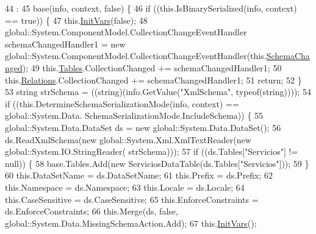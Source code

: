 \begin{DoxyCode}
44                                                                                                            
                                                 : 
45                 base(info, context, \textcolor{keyword}{false}) \{
46             \textcolor{keywordflow}{if} ((this.IsBinarySerialized(info, context) == \textcolor{keyword}{true})) \{
47                 this.\hyperlink{class_proyecto___integrador__3_1_1ds_servicios_a58f88c51e90b3494390aa1cd37635db0}{InitVars}(\textcolor{keyword}{false});
48                 global::System.ComponentModel.CollectionChangeEventHandler schemaChangedHandler1 = \textcolor{keyword}{new} 
      global::System.ComponentModel.CollectionChangeEventHandler(this.\hyperlink{class_proyecto___integrador__3_1_1ds_servicios_ac0aff57addf6d1f24077d11c3abe845e}{SchemaChanged});
49                 this.\hyperlink{class_proyecto___integrador__3_1_1ds_servicios_a2b08d569f4f435957a1f10b46c304cb2}{Tables}.CollectionChanged += schemaChangedHandler1;
50                 this.\hyperlink{class_proyecto___integrador__3_1_1ds_servicios_a4a938f593d4405efc7c790a3b3a5b9d7}{Relations}.CollectionChanged += schemaChangedHandler1;
51                 \textcolor{keywordflow}{return};
52             \}
53             \textcolor{keywordtype}{string} strSchema = ((string)(info.GetValue(\textcolor{stringliteral}{"XmlSchema"}, typeof(\textcolor{keywordtype}{string}))));
54             \textcolor{keywordflow}{if} ((this.DetermineSchemaSerializationMode(info, context) == global::System.Data.
      SchemaSerializationMode.IncludeSchema)) \{
55                 global::System.Data.DataSet ds = \textcolor{keyword}{new} global::System.Data.DataSet();
56                 ds.ReadXmlSchema(\textcolor{keyword}{new} global::System.Xml.XmlTextReader(\textcolor{keyword}{new} global::System.IO.StringReader(
      strSchema)));
57                 \textcolor{keywordflow}{if} ((ds.Tables[\textcolor{stringliteral}{"Servicios"}] != null)) \{
58                     base.Tables.Add(\textcolor{keyword}{new} ServiciosDataTable(ds.Tables[\textcolor{stringliteral}{"Servicios"}]));
59                 \}
60                 this.DataSetName = ds.DataSetName;
61                 this.Prefix = ds.Prefix;
62                 this.Namespace = ds.Namespace;
63                 this.Locale = ds.Locale;
64                 this.CaseSensitive = ds.CaseSensitive;
65                 this.EnforceConstraints = ds.EnforceConstraints;
66                 this.Merge(ds, \textcolor{keyword}{false}, global::System.Data.MissingSchemaAction.Add);
67                 this.\hyperlink{class_proyecto___integrador__3_1_1ds_servicios_a58f88c51e90b3494390aa1cd37635db0}{InitVars}();

\end{DoxyCode}
